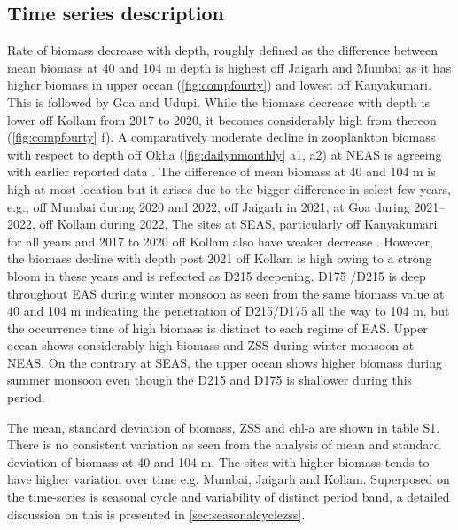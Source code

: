 \documentclass[authoryear,review,12pt]{elsarticle}
\begin{document}
	
	\subsection{Time series description}
	\label{sec:timeseries}
	Rate of biomass decrease with depth, roughly defined as the difference between mean biomass at 40  and 104 m depth is highest off Jaigarh and Mumbai as it has higher biomass in upper ocean (\cref{fig:compfourty}) and lowest off Kanyakumari. This is followed by Goa and Udupi. While the biomass decrease with depth is lower off Kollam from 2017 to 2020, it becomes considerably high from thereon (\cref{fig:compfourty} f). A comparatively moderate decline in zooplankton biomass with respect to depth off Okha (\cref{fig:dailynmonthly} a1, a2) at NEAS is agreeing with earlier reported data \citep{wishner1998mesozooplankton, madhupratap2001mesozooplankton, smith2005mesozooplankton,jyothibabu2010re}. The difference of mean biomass at 40 and 104 m is high at most location but it arises due to the bigger difference in select few years, e.g., off Mumbai during 2020 and 2022, off Jaigarh in 2021, at Goa during 2021--2022, off Kollam during 2022. The sites at SEAS, particularly off Kanyakumari for all years and 2017 to 2020 off Kollam also have weaker decrease \citep{madhupratap2001mesozooplankton, jyothibabu2010re, aparna2022seasonal}. However, the biomass decline with depth post 2021 off Kollam is high owing to a strong bloom in these years and is reflected as D215 deepening. D175 /D215 is deep throughout EAS during winter monsoon as seen from the same biomass value at 40 and 104 m indicating the penetration of D215/D175 all the way to 104 m, but the occurrence time of high biomass is distinct to each regime of EAS. Upper ocean shows considerably high biomass and ZSS during winter monsoon at NEAS. On the contrary at SEAS, the upper ocean shows higher biomass during summer monsoon even though the D215 and D175 is shallower during this period. 
		
	The mean, standard deviation of biomass, ZSS and chl-a are shown in table S1. There is no consistent variation as seen from the analysis of mean and standard deviation of biomass at 40 and 104 m. The sites with higher biomass tends to have higher variation over time e.g. Mumbai, Jaigarh and Kollam. Superposed on the time-series is seasonal cycle and variability of distinct period band, a detailed discussion on this is presented in \cref{sec:seasonalcyclezss}. 
		
\end{document}
